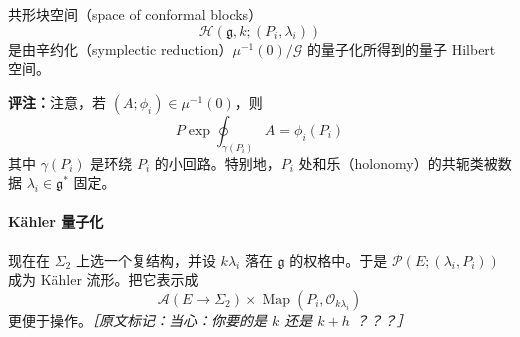 
\begin{definition}
共形块空间（space of conformal blocks）
\begin{equation}
  \mathcal{H}(\mathfrak{g},k;(P_i,\lambda_i))
  \tag{3.74}
  \label{eq:3.74}
\end{equation}
是由辛约化（symplectic reduction）$\mu^{-1}(0)/\mathcal{G}$ 的量子化所得到的量子 Hilbert 空间。
\end{definition}

\textbf{评注：}注意，若 $(A;\phi_i)\in\mu^{-1}(0)$，则
\begin{equation}
  P\exp\oint_{\gamma(P_i)}A=\phi_i(P_i)
  \tag{3.75}
  \label{eq:3.75}
\end{equation}
其中 $\gamma(P_i)$ 是环绕 $P_i$ 的小回路。特别地，$P_i$ 处和乐（holonomy）的共轭类被数据 $\lambda_i\in\mathfrak{g}^*$ 固定。

\paragraph{Kähler 量子化} %

现在在 $\Sigma_2$ 上选一个复结构，并设 $k\lambda_i$ 落在 $\mathfrak{g}$ 的权格中。于是 $\mathcal{P}(E;(\lambda_i,P_i))$ 成为 Kähler 流形。把它表示成
\begin{equation}
  \mathcal{A}(E\to\Sigma_2)\times\operatorname{Map}(P_i,\mathcal{O}_{k\lambda_i})
  \tag{3.76}
  \label{eq:3.76}
\end{equation}
更便于操作。{\small\itshape ［原文标记：当心：你要的是 $k$ 还是 $k+h$ ？？？］}

